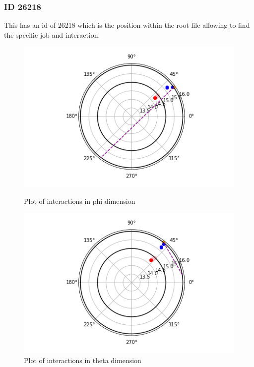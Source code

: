 \documentclass[a4paper]{article}
\begin{document}
\subsubsection{ID 26218}
This has an id of 26218 which is the position within the root file allowing to find the specific job and interaction.
\begin{figure}[H] 
  \label{ fig7} 
  \begin{minipage}[b]{0.5\linewidth}
    \centering
    \includegraphics[width=1\linewidth]{id 26218/26_2_phi.png} 
    \caption{Plot of interactions in phi dimension} 
    \vspace{4ex}
  \end{minipage}%
  \begin{minipage}[b]{0.5\linewidth}
    \centering
    \includegraphics[width=1\linewidth]{id 26218/26_2_theta.png} 
    \caption{Plot of interactions in theta dimension} 
    \vspace{4ex}

\end{minipage}
\end{figure}
\end{document}
